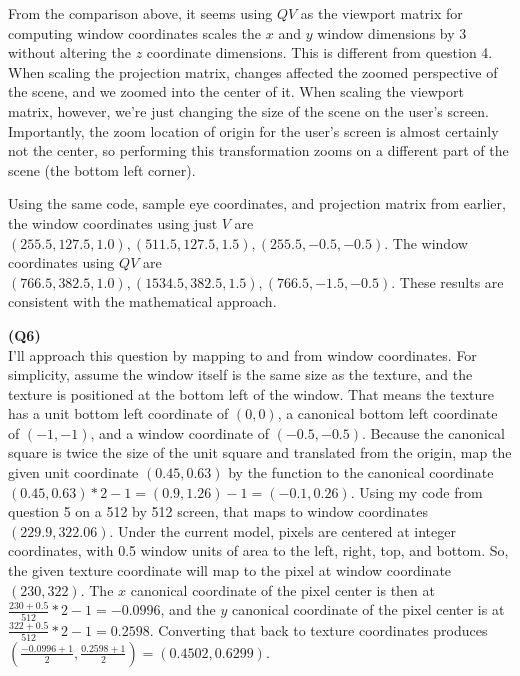 \documentclass[letterpaper, 11pt]{article}
\begin{document}
From the comparison above, it seems using $QV$ as the viewport matrix for computing window coordinates scales the $x$ and $y$ window dimensions by $3$ without altering the $z$ coordinate dimensions. This is different from question 4. When scaling the projection matrix, changes affected the zoomed perspective of the scene, and we zoomed into the center of it. When scaling the viewport matrix, however, we're just changing the size of the scene on the user's screen. Importantly, the zoom location of origin for the user's screen is almost certainly not the center, so performing this transformation zooms on a different part of the scene (the bottom left corner). 


\medskip
Using the same code, sample eye coordinates, and projection matrix from earlier, the window coordinates using just $V$ are $(255.5, 127.5, 1.0), (511.5, 127.5, 1.5), (255.5, -0.5, -0.5)$. The window coordinates using $QV$ are $(766.5, 382.5, 1.0), (1534.5, 382.5, 1.5), (766.5, -1.5, -0.5)$. These results are consistent with the mathematical approach. 


\medskip
\textbf{(Q6)} \\ 
I'll approach this question by mapping to and from window coordinates. For simplicity, assume the window itself is the same size as the texture, and the texture is positioned at the bottom left of the window. That means the texture has a unit bottom left coordinate of $(0, 0)$, a canonical bottom left coordinate of $(-1, -1)$, and a window coordinate of $(-0.5, -0.5)$. Because the canonical square is twice the size of the unit square and translated from the origin, map the given unit coordinate $(0.45, 0.63)$ by the function to the canonical coordinate $(0.45, 0.63) * 2 - 1= (0.9, 1.26) - 1 = (-0.1, 0.26)$. Using my code from question 5 on a 512 by 512 screen, that maps to window coordinates $(229.9, 322.06)$. Under the current model, pixels are centered at integer coordinates, with 0.5 window units of area to the left, right, top, and bottom. So, the given texture coordinate will map to the pixel at window coordinate $(230, 322)$. The $x$ canonical coordinate of the pixel center is then at $\frac{230 + 0.5}{512} * 2 - 1 = -0.0996$, and the $y$ canonical coordinate of the pixel center is at $\frac{322 + 0.5}{512} * 2 - 1 = 0.2598$. Converting that back to texture coordinates produces $(\frac{-0.0996 + 1}{2}, \frac{0.2598 + 1}{2}) = (0.4502, 0.6299)$. 
\end{document}
